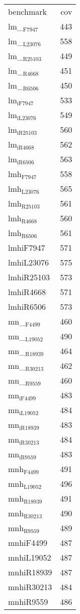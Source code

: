 \begin{center}
\begin{tabular}{lr}
benchmark & cov\\
lm\_$_{\text{F7947}}$ & 443\\
lm\_$_{\text{L23076}}$ & 558\\
lm\_$_{\text{R25103}}$ & 449\\
lm\_$_{\text{R4668}}$ & 451\\
lm\_$_{\text{R6506}}$ & 450\\
lm$_{\text{iF7947}}$ & 533\\
lm$_{\text{iL23076}}$ & 549\\
lm$_{\text{iR25103}}$ & 560\\
lm$_{\text{iR4668}}$ & 562\\
lm$_{\text{iR6506}}$ & 563\\
lmh$_{\text{F7947}}$ & 558\\
lmh$_{\text{L23076}}$ & 565\\
lmh$_{\text{R25103}}$ & 561\\
lmh$_{\text{R4668}}$ & 560\\
lmh$_{\text{R6506}}$ & 561\\
lmhiF7947 & 571\\
lmhiL23076 & 575\\
lmhiR25103 & 573\\
lmhiR4668 & 571\\
lmhiR6506 & 573\\
mn\_$_{\text{F4499}}$ & 460\\
mn\_$_{\text{L19052}}$ & 490\\
mn\_$_{\text{R18939}}$ & 464\\
mn\_$_{\text{R30213}}$ & 462\\
mn\_$_{\text{R9559}}$ & 460\\
mn$_{\text{iF4499}}$ & 483\\
mn$_{\text{iL19052}}$ & 484\\
mn$_{\text{iR18939}}$ & 483\\
mn$_{\text{iR30213}}$ & 484\\
mn$_{\text{iR9559}}$ & 483\\
mnh$_{\text{F4499}}$ & 491\\
mnh$_{\text{L19052}}$ & 496\\
mnh$_{\text{R18939}}$ & 491\\
mnh$_{\text{R30213}}$ & 490\\
mnh$_{\text{R9559}}$ & 489\\
mnhiF4499 & 487\\
mnhiL19052 & 487\\
mnhiR18939 & 487\\
mnhiR30213 & 484\\
mnhiR9559 & 486\\
\end{tabular}
\end{center}

